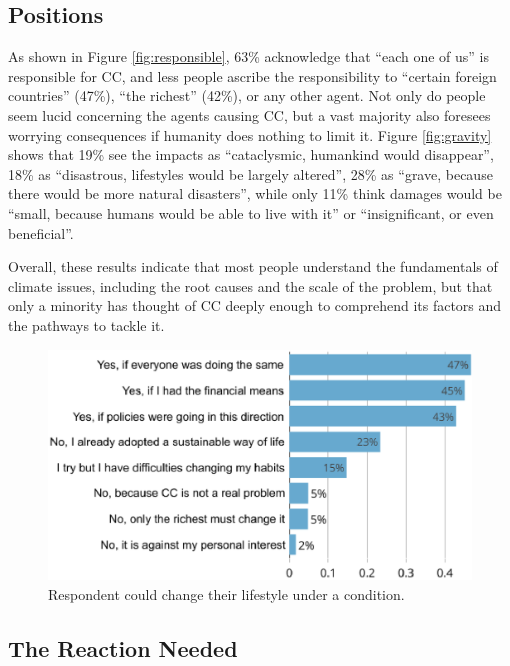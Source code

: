 \documentclass[english,5p,authoryear]{elsarticle}
\begin{document}
    \subsection{Positions\label{subsec:opinions}}
%
As shown in Figure \ref{fig:responsible}, 63\% acknowledge that ``each one of us'' is responsible for CC, and less people ascribe the responsibility to ``certain foreign countries'' (47\%), ``the richest'' (42\%), or any other agent.  Not only do people seem lucid concerning the agents causing CC, but a vast majority also foresees worrying consequences if humanity does nothing to limit it. Figure \ref{fig:gravity} shows that 19\% see the impacts as ``cataclysmic, humankind would disappear'', 18\% as ``disastrous, lifestyles would be largely altered'', 28\% as ``grave, because there would be more natural disasters'', while only 11\% think damages would be ``small, because humans would be able to live with it'' or ``insignificant, or even beneficial''. 

%

%

Overall, these results indicate that most people understand the fundamentals of climate issues, including the root causes and the scale of the problem, but that only a minority has thought of CC deeply enough to comprehend its factors and the pathways to tackle it.
%

%
%
    
%
%

\begin{figure}[t]
\centering
\includegraphics[width=\columnwidth]{Images_EPS/change_if_no.eps}
\caption{Respondent could change their lifestyle under a condition.}
\label{fig:condition}
\end{figure}

    \subsection{The Reaction Needed\label{subsec:reaction}}
\end{document}
